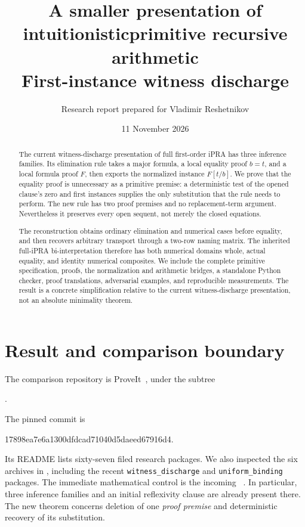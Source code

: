 \documentclass[11pt,a4paper]{article}
\title{A smaller presentation of intuitionistic\newline primitive recursive arithmetic\\[4pt]
\large First-instance witness discharge}
\author{Research report prepared for Vladimir Reshetnikov}
\date{11 November 2026}
\theoremstyle{definition}\newtheorem{definition}[theorem]{Definition}
\theoremstyle{remark}\newtheorem{remark}[theorem]{Remark}
\begin{document}
\maketitle
\begin{abstract}
The current witness-discharge presentation of full first-order iPRA has
three inference families. Its elimination rule takes a major formula,
a local equality proof $b=t$, and a local formula proof $F$, then exports
the normalized instance $F[t/b]$. We prove that the equality proof is
unnecessary as a primitive premise: a deterministic test of the opened
clause's zero and first instances supplies the only substitution that
the rule needs to perform. The new rule has two proof premises and no
replacement-term argument. Nevertheless it preserves every open sequent,
not merely the closed equations.

The reconstruction obtains ordinary elimination and numerical cases
before equality, and then recovers arbitrary transport through a
two-row naming matrix. The inherited full-iPRA bi-interpretation therefore
has both numerical domains whole, actual equality, and identity numerical
composites. We include the complete primitive specification, proofs,
the normalization and arithmetic bridges, a standalone Python checker,
proof translations, adversarial examples, and reproducible measurements.
The result is a concrete simplification relative to the current
witness-discharge presentation, not an absolute minimality theorem.
\end{abstract}
\tableofcontents
\clearpage

\section{Result and comparison boundary}
\label{sec:boundary}

The comparison repository is ProveIt~\cite{baseline}, under the subtree
\begin{center}\small{}.\end{center}
The pinned commit is
\begin{center}\small\ttfamily 17898ea7e6a1300dfdcad71040d5daeed67916d4.\end{center}
Its README lists sixty-seven filed research packages. We also inspected
the six archives in , including the recent
\texttt{witness\_discharge} and \texttt{uniform\_binding} packages.
The immediate mathematical control is the incoming
~\cite{witness}.
In particular, three inference families and an initial reflexivity clause
are already present there. The new theorem concerns deletion of one
\emph{proof premise} and deterministic recovery of its substitution.
\end{document}
